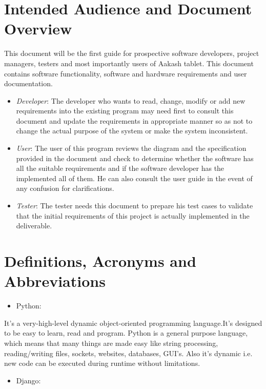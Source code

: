 \documentclass[letterpaper,10pt,english]{sphinxmanual}
\begin{document}
\section{Intended Audience and Document Overview}
\label{unifieddoc:intended-audience-and-document-overview}
This document will be the first guide for prospective software developers, project managers, testers and most importantly users of Aakash tablet. This document contains software functionality, software and hardware requirements and user documentation.
\begin{itemize}
\item {} 
\emph{Developer}: The developer who wants to read, change, modify or add new requirements into the existing program may need first to consult this document and update the requirements in appropriate manner so as not to change the actual purpose of the system or make the system inconsistent.

\item {} 
\emph{User}: The user of this program reviews the diagram and the specification provided in the document and check to determine whether the software has all the suitable requirements and if the software developer has the implemented all of them. He can also consult the user guide in the event of any confusion for clarifications.

\item {} 
\emph{Tester}: The tester needs this document to prepare his test cases to validate that the initial requirements of this project is actually implemented in the deliverable.

\end{itemize}


\section{Definitions, Acronyms and Abbreviations}
\label{unifieddoc:definitions-acronyms-and-abbreviations}\begin{itemize}
\item {} 
Python:

\end{itemize}

It's a very-high-level dynamic object-oriented programming language.It's designed to be easy to learn, read and program. Python is a general purpose language, which means that many things are made easy like string processing, reading/writing files, sockets, websites, databases, GUI’s. Also it's dynamic i.e. new code can be executed during runtime without limitations.
\begin{itemize}
\item {} 
Django:

\end{itemize}
\end{document}
